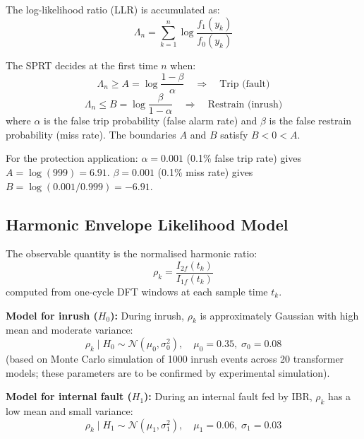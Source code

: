 The log-likelihood ratio (LLR) is accumulated as:
\begin{equation}
  \Lambda_n = \sum_{k=1}^{n} \log\frac{f_1(y_k)}{f_0(y_k)}
  \label{eq:ch6_llr}
\end{equation}

The SPRT decides at the first time $n$ when:
\begin{equation}
  \Lambda_n \geq A = \log\frac{1-\beta}{\alpha}
  \quad \Rightarrow \quad \text{Trip (fault)}
  \label{eq:ch6_sprt_trip}
\end{equation}
\begin{equation}
  \Lambda_n \leq B = \log\frac{\beta}{1-\alpha}
  \quad \Rightarrow \quad \text{Restrain (inrush)}
  \label{eq:ch6_sprt_restrain}
\end{equation}
where $\alpha$ is the false trip probability (false alarm rate) and
$\beta$ is the false restrain probability (miss rate).
The boundaries $A$ and $B$ satisfy $B < 0 < A$.

For the protection application:
$\alpha = 0.001$ (0.1\% false trip rate) gives $A = \log(999) = 6.91$.
$\beta = 0.001$ (0.1\% miss rate) gives $B = \log(0.001/0.999) = -6.91$.

\subsection{Harmonic Envelope Likelihood Model}

The observable quantity is the normalised harmonic ratio:
\begin{equation}
  \rho_k = \frac{I_{2f}(t_k)}{I_{1f}(t_k)}
  \label{eq:ch6_rho}
\end{equation}
computed from one-cycle DFT windows at each sample time $t_k$.

\textbf{Model for inrush ($H_0$):} During inrush, $\rho_k$ is approximately
Gaussian with high mean and moderate variance:
\begin{equation}
  \rho_k \mid H_0 \sim \mathcal{N}(\mu_0, \sigma_0^2), \quad
  \mu_0 = 0.35, \;\sigma_0 = 0.08
  \label{eq:ch6_h0_model}
\end{equation}
(based on Monte Carlo simulation of 1000 inrush events across 20 transformer
models; these parameters are to be confirmed by experimental simulation).

\textbf{Model for internal fault ($H_1$):} During an internal fault fed
by IBR, $\rho_k$ has a low mean and small variance:
\begin{equation}
  \rho_k \mid H_1 \sim \mathcal{N}(\mu_1, \sigma_1^2), \quad
  \mu_1 = 0.06, \;\sigma_1 = 0.03
  \label{eq:ch6_h1_model}
\end{equation}

